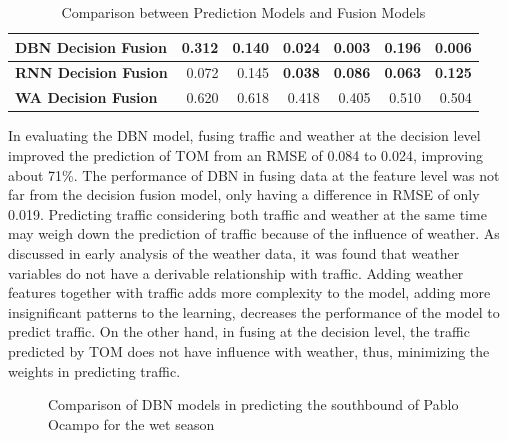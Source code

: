 \begin{table}[h]
\begin{tabular}{|l|r|r|r|r|r|r|}
\textbf{DBN Decision Fusion}                & 0.312                              & 0.140                             & 0.024                              & 0.003                             & 0.196                              & 0.006                             \\ \hline
\textbf{RNN Decision Fusion}                & 0.072                              & 0.145                             & \textbf{0.038}                     & \textbf{0.086}                    & \textbf{0.063}                     & \textbf{0.125}                    \\ \hline
\textbf{WA Decision Fusion}                 & 0.620                              & 0.618                             & 0.418                              & 0.405                             & 0.510                              & 0.504                             \\ \hline
\end{tabular}
\caption{Comparison between Prediction Models and Fusion Models}
\label{table:fusion_results}
\end{table}

In evaluating the DBN model, fusing traffic and weather at the decision level improved the prediction of TOM from an RMSE of 0.084 to 0.024, improving about 71\%. The performance of DBN in fusing data at the feature level was not far from the decision fusion model, only having a difference in RMSE of only 0.019. Predicting traffic considering both traffic and weather at the same time may weigh down the prediction of traffic because of the influence of weather. As discussed in early analysis of the weather data, it was found that weather variables do not have a derivable relationship with traffic. Adding weather features together with traffic adds more complexity to the model, adding more insignificant patterns to the learning, decreases the performance of the model to predict traffic. On the other hand, in fusing at the decision level, the traffic predicted by TOM does not have influence with weather, thus, minimizing the weights in predicting traffic. 


\begin{figure}[h]
  \centering
  \captionsetup{justification=centering}
  \caption{Comparison of DBN models in predicting the southbound of Pablo Ocampo for the wet season}
  \label{fig:dbn_comp_pocampo}
\end{figure}

